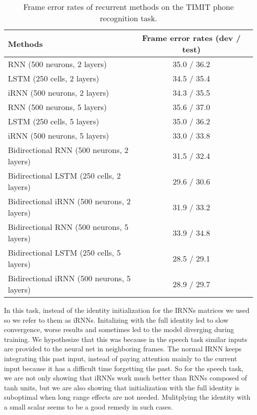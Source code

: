 \documentclass{article} \usepackage{nips14submit_e,times,graphicx}
\begin{document}
\begin{table}[h!]
\centering
\begin{tabular}{|l|c|c|}
\hline {\bf Methods} & {\bf Frame error rates (dev / test) } \\\hline
\hline RNN (500 neurons, 2 layers) & 35.0 / 36.2 \\ LSTM (250 cells, 2
layers) & 34.5 / 35.4 \\ iRNN (500 neurons, 2 layers) & 34.3 / 35.5
\\\hline \hline

RNN (500 neurons, 5 layers)                 &  35.6 / 37.0   \\
LSTM (250 cells, 5 layers)                  &  35.0 / 36.2   \\
iRNN (500 neurons, 5 layers)                &  33.0 / 33.8   \\\hline \hline 

Bidirectional RNN (500 neurons, 2 layers)   &  31.5 / 32.4   \\
Bidirectional LSTM (250 cells, 2 layers)    &  29.6 / 30.6   \\
Bidirectional iRNN (500 neurons, 2 layers)  &  31.9 / 33.2        \\\hline \hline 

Bidirectional RNN (500 neurons, 5 layers)   &  33.9 / 34.8   \\
Bidirectional LSTM (250 cells, 5 layers)    &   28.5 / 29.1  \\
Bidirectional iRNN (500 neurons, 5 layers)  &  28.9 / 29.7   \\\hline 
\end{tabular}
\caption{Frame error rates of recurrent methods on the TIMIT phone
  recognition task.}
\label{tab:speech}
\end{table}

In this task, instead of the identity initialization for the IRNNs
matrices we used  so we refer to them as iRNNs.  Initalizing
with the full identity led to slow convergence, worse results and
sometimes led to the model diverging during training. We hypothesize
that this was because in the speech task similar inputs are provided
to the neural net in neighboring frames. The normal IRNN keeps
integrating this past input, instead of paying attention mainly to the
current input because it has a difficult time forgetting the past.  So
for the speech task, we are not only showing that iRNNs work much
better than RNNs composed of tanh units, but we are also showing that
initialization with the full identity is suboptimal when long range
effects are not needed. Mulitplying the identity with a small scalar
seems to be a good remedy in such cases.
\end{document}

